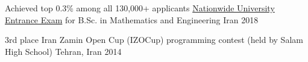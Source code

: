 
\begin{cvhonors}

  \cvhonor
    {Achieved top 0.3\% among all 130,000+ applicants} %
    {\href{https://en.wikipedia.org/wiki/Iranian_University_Entrance_Exam}{Nationwide University Entrance Exam} for B.Sc. in Mathematics and Engineering} %
    {Iran} %
    {2018} %

  \cvhonor
    {3rd place} %
    {Iran Zamin Open Cup (IZOCup) programming contest (held by Salam High School)} %
    {Tehran, Iran} %
    {2014} %

\end{cvhonors}
